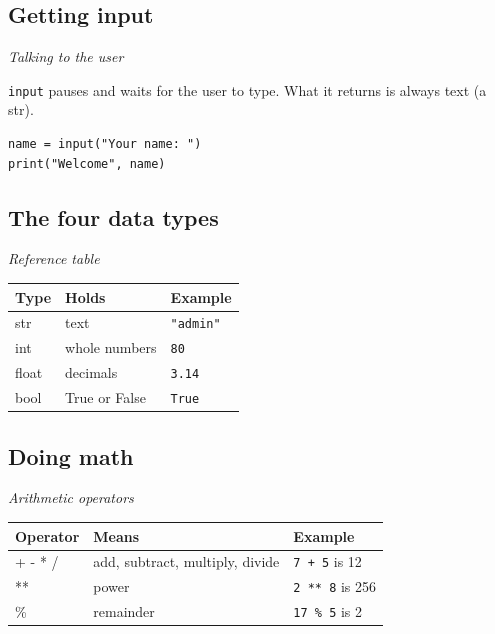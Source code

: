 \documentclass[12pt,openany]{book}
\begin{document}
\subsection*{Getting input}
{\small\itshape\color{gray}Talking to the user}


\texttt{input} pauses and waits for the user to type. What it returns is always text (a str).

\begin{lstlisting}
name = input("Your name: ")
print("Welcome", name)\end{lstlisting}

\medskip

\subsection*{The four data types}
{\small\itshape\color{gray}Reference table}


\begin{center}\small\begin{tabular}{p{4.3cm}p{4.3cm}p{4.3cm}}\toprule
\textbf{Type} & \textbf{Holds} & \textbf{Example} \\ \midrule
str & text & \texttt{"admin"} \\
int & whole numbers & \texttt{80} \\
float & decimals & \texttt{3.14} \\
bool & True or False & \texttt{True} \\
\bottomrule\end{tabular}\end{center}

\medskip

\subsection*{Doing math}
{\small\itshape\color{gray}Arithmetic operators}


\begin{center}\small\begin{tabular}{p{4.3cm}p{4.3cm}p{4.3cm}}\toprule
\textbf{Operator} & \textbf{Means} & \textbf{Example} \\ \midrule
+ - * / & add, subtract, multiply, divide & \texttt{7 + 5} is 12 \\
** & power & \texttt{2 ** 8} is 256 \\
\% & remainder & \texttt{17 \% 5} is 2 \\
\bottomrule\end{tabular}\end{center}
\end{document}
